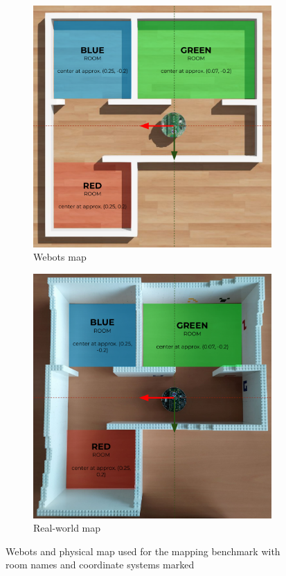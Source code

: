 \begin{figure}[H]
\centering
\begin{subfigure}{.452\textwidth}
  \centering
  \includegraphics[width=0.97\linewidth]{results/figures/map_webots}
  \caption{Webots map}
  \label{fig:results:map:map_webots}
\end{subfigure}%
\begin{subfigure}{.448\textwidth}
  \centering
  \includegraphics[width=0.97\linewidth]{results/figures/map_real_world}
  \caption{Real-world map}
  \label{fig:results:map:map_real_world}
\end{subfigure}
\caption[Webots map used for the mapping benchmark]{Webots and physical map used for the mapping benchmark with room names and coordinate systems marked}
\label{fig:results:camera_load}
\end{figure}


